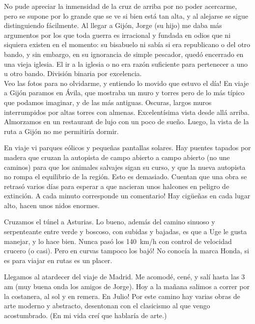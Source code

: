 No pude apreciar la inmensidad de la cruz de arriba por no poder acercarme,
pero se supone por lo grande que se ve si bien est\'a tan alta, y al alejarse
se sigue distinguiendo f\'acilmente. Al llegar a Gij\'on, Jorge (su hijo) me
daba m\'as argumentos por los que toda guerra es irracional y fundada en odios
que ni siquiera existen en el momento: su bisabuelo ni sab\'ia si era
republicano o del otro bando, y sin embargo, en su ignorancia de simple
pescador, qued\'o encerrado en una vieja iglesia. El ir a la iglesia o no era
raz\'on suficiente para pertenecer a uno u otro bando. Divisi\'on binaria por
excelencia.\\

\textexclamdown Veo las fotos para no olvidarme, y entiendo lo movido que
estuvo el d\'ia! En viaje a Gij\'on paramos en \'Avila, que mostraba un muro y
torres pero de lo m\'as t\'ipico que podamos imaginar, y de las m\'as
antiguas. Oscuras, largos muros interrumpidos por altas torres con almenas.
Excelent\'isima vista desde all\'a arriba. Almorzamos en un restaurant de lujo
con un poco de sue\~no. Luego, la vista de la ruta a Gij\'on no me permitir\'ia
dormir.

En viaje vi parques e\'olicos y peque\~nas pantallas solares. Hay puentes
tapados por madera que cruzan la autopista de campo abierto a campo abierto
(no une caminos) para que los animales salvajes sigan su curso, y que la nueva
autopista no rompa el equilibrio de la regi\'on. Esto es demasiado. Cuentan
que una obra se retras\'o varios d\'ias para esperar a que nacieran unos
halcones en peligro de extinci\'on. \textexclamdown A cada minuto corresponde
un comentario! Hay cig\"ue\~nas en cada lugar alto, hacen unos nidos enormes.

Cruzamos el t\'unel a Asturias. Lo bueno, adem\'as del camino sinuoso y
serpenteante entre verde y boscoso, con subidas y bajadas, es que a Uge le
gusta manejar, y lo hace bien. Nunca pas\'o los 140~km/h con control de
velocidad crucero (o casi). \textexclamdown Pero en curvas tampoco los baj\'o!
No conoc\'ia la marca Honda, si es para viajar en rutas es un placer.

Llegamos al atardecer del viaje de Madrid. Me acomod\'e, cen\'e, y sal\'i
hasta las 3 am (muy buena onda los amigos de Jorge). Hoy a la ma\~nana salimos
a correr por la costanera, al sol y en remera. \textexclamdown En Julio! Por
este camino hay varias obras de arte moderno y abstracto, desentonan con el
clasicismo al que vengo acostumbrado. (En mi vida cre\'i que hablar\'ia de
arte.)

